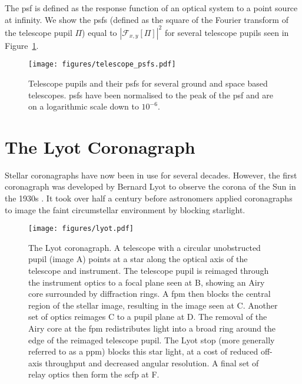 \documentclass[letterpaper]{ar-1col}
\begin{document}
The \ac{psf} is defined as the response function of an optical system to a point source at infinity.
%
We show the \acp{psf} (defined as the square of the Fourier transform of the telescope pupil $\Pi$) equal to $|\mathcal{F}_{x,y}[\Pi]|^2$ for several telescope pupils seen in Figure~\ref{fig:telpsfs}.

\begin{figure}[ht]
  \centering
  \texttt{[image: figures/telescope\_psfs.pdf]}
  \caption{Telescope pupils and their \acp{psf} for several ground and space based telescopes.
  \acp{psf} have been normalised to the peak of the \ac{psf} and are on a logarithmic scale down to $10^{-6}$.}
  \label{fig:telpsfs}
\end{figure}


\section{The Lyot Coronagraph}

Stellar coronagraphs have now been in use for several decades.
%
However, the first coronagraph was developed by Bernard Lyot to observe the corona of the Sun in the 1930s \citep{Lyot39}.
%
It took over half a century before astronomers applied coronagraphs to image the faint circumstellar environment by blocking starlight. 

\begin{figure}[ht]
  \centering
  \texttt{[image: figures/lyot.pdf]}
  \caption{The Lyot coronagraph.
  A telescope with a circular unobstructed pupil (image A) points at a star along the optical axis of the telescope and instrument.
  The telescope pupil is reimaged through the instrument optics to a focal plane seen at B, showing an Airy core surrounded by diffraction rings.
  A \acl{fpm} then blocks the central region of the stellar image, resulting in the image seen at C.
  Another set of optics reimages C to a pupil plane at D.
  The removal of the Airy core at the \acl{fpm} redistributes light into a broad ring around the edge of the reimaged telescope pupil.
  The Lyot stop (more generally referred to as a \acl{ppm}) blocks this star light, at a cost of reduced off-axis throughput and decreased angular resolution.
  A final set of relay optics then form the \acl{scfp} at F.}
  \label{fig:lyot}
\end{figure}
\end{document}
